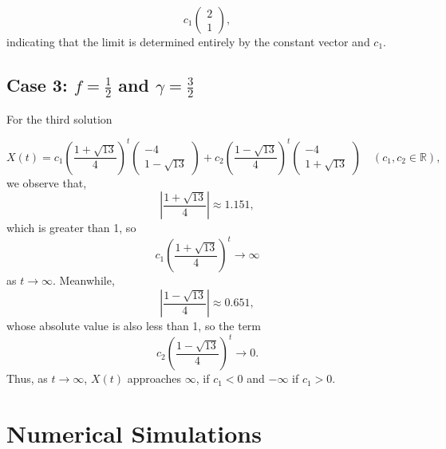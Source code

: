 \documentclass [a4paper]{article}
\begin{document}
\[
c_1\begin{pmatrix} 2 \\ 1 \end{pmatrix},
\]
indicating that the limit is determined entirely by the constant vector and \(c_1\).

\newpage
\subsection*{Case 3: \( f = \frac{1}{2} \) and \( \gamma = \frac{3}{2} \)}

For the third solution 

\[
X(t) = c_1{\left(\frac{1 + \sqrt{13}}{4}\right)}^t\begin{pmatrix}
    -4 \\ 1-\sqrt{13}
\end{pmatrix} + c_2{\left(\frac{1 - \sqrt{13}}{4}\right)}^t\begin{pmatrix}
    -4 \\ 1 +\sqrt{13}
\end{pmatrix} \quad (c_1,c_2 \in \mathbb{R}),
\]
we observe that, 
\[
\left| \frac{1 + \sqrt{13}}{4} \right| \approx 1.151,
\]
which is greater than 1, so 
\[
c_1{\left(\frac{1 + \sqrt{13}}{4}\right)}^t \to \infty
\]
as \( t \to \infty \). 
Meanwhile, 
\[
\left| \frac{1 - \sqrt{13}}{4} \right| \approx 0.651,
\]
whose absolute value is also less than 1, so the term 
\[
c_2{\left(\frac{1 - \sqrt{13}}{4}\right)}^t \to 0.
\]
Thus, as \(t \to \infty\), \(X(t)\) approaches \(\infty\), if  \(c_1  <  0\)  and \(-\infty\) if \(c_1 >0\).

\section{Numerical Simulations}
\end{document}
